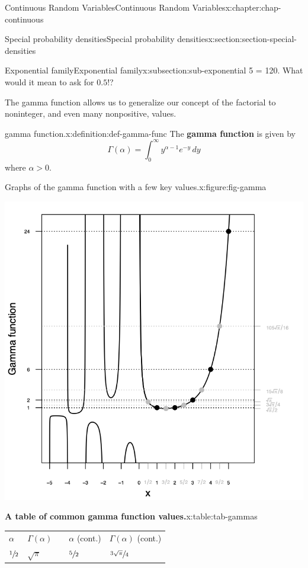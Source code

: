\documentclass[oneside,10pt,]{book}
\newcommand{\tabularfont}{\relax}
\newcommand{\terminology}[1]{\textbf{#1}}
\newcommand{\hrulemedium}{\noalign{\hrule height 0.07em}}
\newcommand{\gt}{>}
\begin{document}
\begin{chapterptx}{Continuous Random Variables}{}{Continuous Random Variables}{}{}{x:chapter:chap-continuous}
\begin{sectionptx}{Special probability densities}{}{Special probability densities}{}{}{x:section:section-special-densities}
\begin{subsectionptx}{Exponential family}{}{Exponential family}{}{}{x:subsection:sub-exponential}
5 = 120\). What would it mean to ask for \(0.5!\)?%
\par
The gamma function allows us to generalize our concept of the factorial to noninteger, and even many nonpositive, values.%
\begin{definition}{gamma function.}{x:definition:def-gamma-func}%
The \terminology{gamma function} is given by%
\begin{equation*}
\Gamma(\alpha)
=\int_0^\infty y^{\alpha - 1}e^{-y}\,dy
\end{equation*}
where \(\alpha \gt
0\).%
\end{definition}
\begin{figureptx}{Graphs of the gamma function with a few key values.}{x:figure:fig-gamma}{}%
\begin{image}{0.25}{0.5}{0.25}%
\includegraphics[width=\linewidth]{./images/gammaplot.png}
\end{image}%
\tcblower
\end{figureptx}%
\begin{tableptx}{\textbf{A table of common gamma function values.}}{x:table:tab-gammas}{}%
\centering
{\tabularfont%
\begin{tabular}{lllll}
\(\alpha\)&\(\Gamma(\alpha)\)&&\(\alpha\) (cont.)&\(\Gamma(\alpha)\) (cont.)\tabularnewline\hrulemedium
\(\sfrac{1}{2}\)&\(\sqrt{\pi}\)&&\(\sfrac{5}{2}\)&\(\sfrac{3\sqrt{\pi}}{4}\)\tabularnewline[0pt]

\end{tabular}}
\end{tableptx}
\end{subsectionptx}
\end{sectionptx}
\end{chapterptx}
\end{document}
